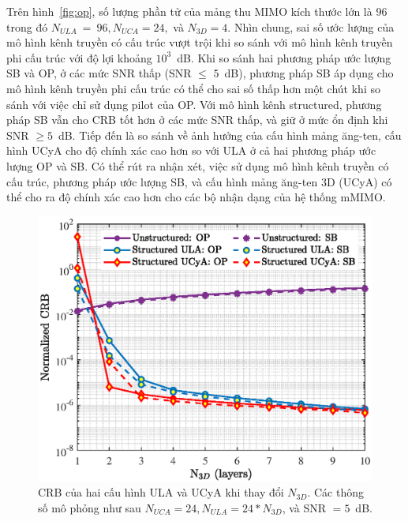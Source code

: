 Trên hình~\ref{fig:op}, số lượng phần tử của mảng thu MIMO kích thước lớn là $96$ trong đó $N_{ULA}~=~96, N_{UCA} = 24,$ và $N_{3D} = 4$. Nhìn chung, sai số ước lượng của mô hình kênh truyền có cấu trúc vượt trội khi so sánh với mô hình kênh truyền phi cấu trúc với độ lợi khoảng $10^3$~dB. Khi so sánh hai phương pháp ước lượng SB và OP, ở các mức SNR thấp (SNR $\le$ $5$~dB), phương pháp SB áp dụng cho mô hình kênh truyền phi cấu trúc có thể cho sai số thấp hơn một chút khi so sánh với việc chỉ sử dụng pilot của OP. Với mô hình kênh structured, phương pháp SB vẫn cho CRB tốt hơn ở các mức SNR thấp, và giữ ở mức ổn định khi SNR $\ge 5$~dB. Tiếp đến là so sánh về ảnh hưởng của cấu hình mảng ăng-ten, cấu hình UCyA cho độ chính xác cao hơn so với ULA ở cả hai phương pháp ước lượng OP và SB. Có thể rút ra nhận xét, việc sử dụng mô hình kênh truyền có cấu trúc, phương pháp ước lượng SB, và cấu hình mảng ăng-ten 3D (UCyA) có thể cho ra độ chính xác cao hơn cho các bộ nhận dạng của hệ thống mMIMO.
\begin{figure}[H]
    \centering
    \includegraphics[width=\linewidth]{figures/fig_2_3.eps}
    \caption{CRB của hai cấu hình ULA và UCyA khi thay đổi $N_{3D}$. Các thông số mô phỏng như sau $N_{UCA} = 24, N_{ULA} = 24 * N_{3D}$, và SNR $=5$~dB.}
    \label{fig:op_N3D}
\end{figure}

